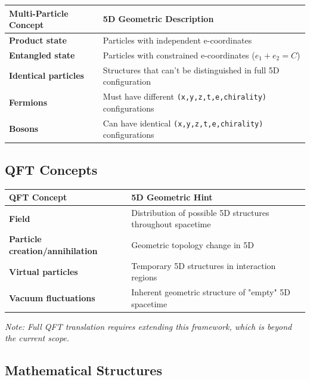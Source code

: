 \documentclass[aps,prd,preprint,superscriptaddress,longbibliography,floatfix]{revtex4-2}
\theoremstyle{remark}
\begin{document}
\begin{table}[H]
\begin{ruledtabular}
\begin{tabular}{p{7.5cm}p{7.5cm}}
Multi-Particle Concept & 5D Geometric Description \\
\hline
\textbf{Product state} & Particles with independent e-coordinates \\
\textbf{Entangled state} & Particles with constrained e-coordinates ($e_{1} + e_{2} = C$) \\
\textbf{Identical particles} & Structures that can't be distinguished in full 5D configuration \\
\textbf{Fermions} & Must have different \texttt{(x,y,z,t,e,chirality)} configurations \\
\textbf{Bosons} & Can have identical \texttt{(x,y,z,t,e,chirality)} configurations \\
\end{tabular}
\end{ruledtabular}
\end{table}


\subsection{QFT Concepts}


\begin{table}[H]
\begin{ruledtabular}
\begin{tabular}{p{7.5cm}p{7.5cm}}
QFT Concept & 5D Geometric Hint \\
\hline
\textbf{Field} & Distribution of possible 5D structures throughout spacetime \\
\textbf{Particle creation/annihilation} & Geometric topology change in 5D \\
\textbf{Virtual particles} & Temporary 5D structures in interaction regions \\
\textbf{Vacuum fluctuations} & Inherent geometric structure of "empty" 5D spacetime \\
\end{tabular}
\end{ruledtabular}
\end{table}

\textit{Note: Full QFT translation requires extending this framework, which is beyond the current scope.}


\subsection{Mathematical Structures}
\end{document}
